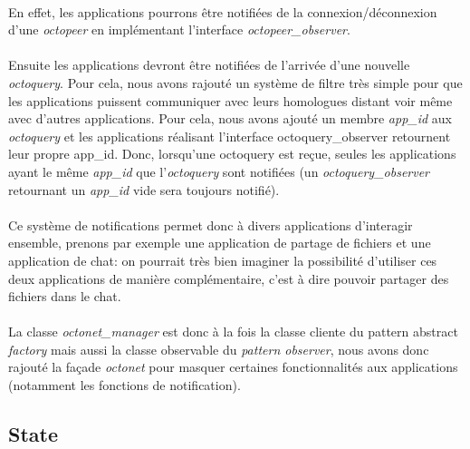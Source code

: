 \documentclass[a4paper]{article}
\begin{document}
			\paragraph{}{
			En effet, les applications pourrons être notifiées de la connexion/déconnexion d’une
			\textit{octopeer} en implémentant l’interface \textit{octopeer\_observer}.
			}
			\paragraph{}{
			Ensuite les applications devront être notifiées de l’arrivée d’une nouvelle \textit{octoquery}. 
			Pour cela, nous avons rajouté un système de filtre très simple pour que les applications 
			puissent communiquer avec leurs homologues distant voir même avec d’autres applications. \newline
			Pour cela, nous avons ajouté un membre \textit{app\_id} aux \textit{octoquery} et les applications réalisant 
			l’interface octoquery\_observer retournent leur propre app\_id. Donc, lorsqu’une octoquery
			est reçue, seules les applications ayant le même \textit{app\_id} que l’\textit{octoquery} sont notifiées 
			(un \textit{octoquery\_observer} retournant un \textit{app\_id} vide sera toujours notifié).
			}

			\paragraph{}{
			Ce système de notifications permet donc à divers applications d’interagir ensemble, prenons par 
			exemple une application de partage de fichiers et une application de chat: on pourrait très bien 
			imaginer la possibilité d’utiliser ces deux applications de manière complémentaire, c’est à dire 
			pouvoir partager des fichiers dans le chat.
			}
			
			\paragraph{}{
			La classe \textit{octonet\_manager} est donc à la fois la classe cliente du pattern abstract \textit{factory} 
			mais aussi la classe observable du \textit{pattern observer}, nous avons donc rajouté la façade 
			\textit{octonet} pour masquer certaines fonctionnalités aux applications (notamment les fonctions de notification).
			}
		
		\newpage 
		
		\subsection{State}
		
\end{document}
